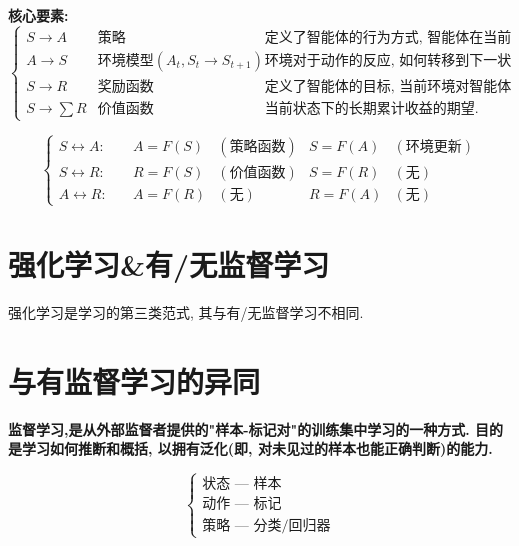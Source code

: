         \bf{核心要素}:
        \begin{displaymath} \left\{ \begin{array}{llll}
            S \to A & \text{策略} & \text{定义了智能体的行为方式, 智能体在当前状态如何动作}\\
            A \to S & \text{环境模型}(A_t,S_t\to S_{t+1}) & \text{环境对于动作的反应, 如何转移到下一状态.(可选)}\\
            S \to R & \text{奖励函数} & \text{定义了智能体的目标, 当前环境对智能体反馈的奖励.}\\
            S \to \sum R & \text{价值函数} & \text{当前状态下的长期累计收益的期望.}
        \end{array} \right. \end{displaymath}

        \begin{displaymath} \left\{ \begin{array}{lllll}
            S \leftrightarrow A: \quad & A = F(S) & (\text{策略函数})    & S = F(A) & (\text{环境更新})\\
            S \leftrightarrow R: \quad & R = F(S) & (\text{价值函数})    & S = F(R) & (\text{无})\\
            A \leftrightarrow R: \quad & A = F(R) & (\text{无})    & R = F(A) & (\text{无})
        \end{array} \right. \end{displaymath}
        
    \section{强化学习\&有/无监督学习}
        强化学习是学习的第三类范式, 其与有/无监督学习不相同.
    
        \section{与有监督学习的异同}
            \bf{监督学习},是从外部监督者提供的"样本-标记对"的训练集中学习的一种方式. 目的是学习如何推断和概括, 以拥有泛化(即, 对未见过的样本也能正确判断)的能力.
        
            \begin{displaymath} \left\{ \begin{array}{l}
                \text{状态 --- 样本}\\
                \text{动作 --- 标记}\\
                \text{策略 --- 分类/回归器}
            \end{array} \right. \end{displaymath}
            
